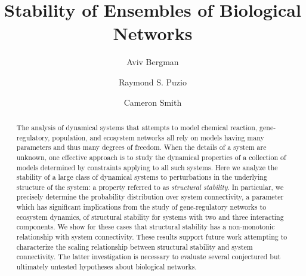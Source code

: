 \documentclass{amsart}
\theoremstyle{definition}
\theoremstyle{remark}
\numberwithin{equation}{section}
\begin{document}
\title{Stability of Ensembles of Biological Networks}

\author{Aviv Bergman}
\address{Department of Systems and Computational Biology, Albert Einstein College of Medicine, Bronx, New York 10461}
\curraddr{}

\author{Raymond S. Puzio}
\address{Department of Systems and Computational Biology, Albert Einstein College of Medicine, Bronx, New York 10461}
\curraddr{}

\author{Cameron Smith}
\address{Department of Systems and Computational Biology, Albert Einstein College of Medicine, Bronx, New York 10461}
\curraddr{}





\begin{abstract}
The analysis of dynamical systems that attempts to model chemical reaction, gene-regulatory, population, and ecosystem networks all rely on models having many parameters and thus many degrees of freedom. When the details of a system are unknown, one effective approach is to study the dynamical properties of a collection of models determined by constraints applying to all such systems. Here we analyze the stability of a large class of dynamical systems to perturbations in the underlying structure of the system: a property referred to as \emph{structural stability}. In particular, we precisely determine the probability distribution over system connectivity, a parameter which has significant implications from the study of gene-regulatory networks to ecosystem dynamics, of structural stability for systems with two and three interacting components. We show for these cases that structural stability has a non-monotonic relationship with system connectivity. These results support future work attempting to characterize the scaling relationship between structural stability and system connectivity. The latter investigation is necessary to evaluate several conjectured but ultimately untested hypotheses about biological networks.
\end{abstract}
\end{document}

